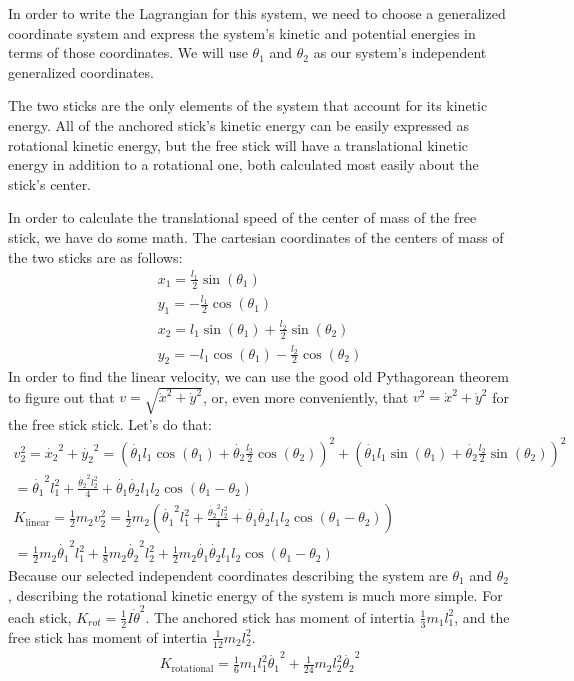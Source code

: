 \documentclass[]{article}
\begin{document}
In order to write the Lagrangian for this system, we need to choose a generalized coordinate system and express the system's kinetic and potential energies in terms of those coordinates. We will use $\theta_1$ and $\theta_2$ as our system's independent generalized coordinates.

The two sticks are the only elements of the system that account for its kinetic energy. All of the anchored stick's kinetic energy can be easily expressed as rotational kinetic energy, but the free stick will have a translational kinetic energy in addition to a rotational one, both calculated most easily about the stick's center.

In order to calculate the translational speed of the center of mass of the free stick, we have do some math. The cartesian coordinates of the centers of mass of the two sticks are as follows:
\begin{gather*}
x_1 = \frac{l_1}{2}\sin(\theta_1) \\
y_1 = -\frac{l_1}{2}\cos(\theta_1) \\
x_2 = l_1\sin(\theta_1) + \frac{l_2}{2}\sin(\theta_2) \\
y_2 = -l_1\cos(\theta_1) - \frac{l_2}{2}\cos(\theta_2)
\end{gather*}
In order to find the linear velocity, we can use the good old Pythagorean theorem to figure out that $v = \sqrt{\dot{x}^2 + \dot{y}^2}$, or, even more conveniently, that $v^2 = \dot{x}^2 + \dot{y}^2$ for the free stick stick. Let's do that:
\begin{gather*}
	v_2^2 = \dot{x_2}^2 + \dot{y_2}^2 = (\dot{\theta_1}l_1\cos(\theta_1) + \dot{\theta_2}\frac{l_2}{2}\cos(\theta_2))^2 + (\dot{\theta_1}l_1\sin(\theta_1) + \dot{\theta_2}\frac{l_2}{2}\sin(\theta_2))^2 \\
	= \dot{\theta_1}^2l_1^2 + \frac{\dot{\theta_2}^2l_2^2}{4} + \dot{\theta_1}\dot{\theta_2}l_1l_2\cos(\theta_1 - \theta_2) \\
	K_{\text{linear}} = \frac12m_2v_2^2 = \frac12m_2(\dot{\theta_1}^2l_1^2 + \frac{\dot{\theta_2}^2l_2^2}{4} + \dot{\theta_1}\dot{\theta_2}l_1l_2\cos(\theta_1 - \theta_2)) \\
	= \frac12m_2\dot{\theta_1}^2l_1^2 + \frac18m_2\dot{\theta_2}^2l_2^2 + \frac12m_2\dot{\theta_1}\dot{\theta_2}l_1l_2\cos(\theta_1 - \theta_2)
\end{gather*}
Because our selected independent coordinates describing the system are $\theta_1$ and $\theta_2$, describing the rotational kinetic energy of the system is much more simple. For each stick, $K_{rot} = \frac12 I \dot{\theta}^2$. The anchored stick has moment of intertia $\frac13m_1l_1^2$, and the free stick has moment of intertia $\frac{1}{12}m_2l_2^2$.
\begin{gather*}
	K_{\text{rotational}} = \frac16m_1l_1^2\dot{\theta_1}^2 + \frac{1}{24}m_2l_2^2\dot{\theta_2}^2
\end{gather*}
\end{document}
